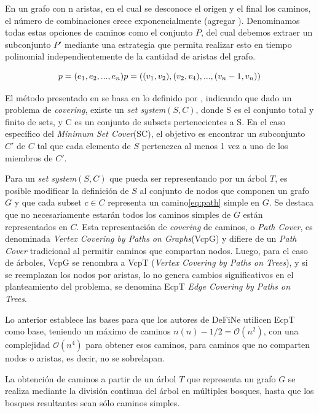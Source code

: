 En un grafo con n aristas, en el cual se desconoce el origen y el final los caminos, el n\'umero de combinaciones crece exponencialmente (agregar \cite{101 y 102 de define}). Denominamos todas estas opciones de caminos como el conjunto $P$, del cual debemos extraer un subconjunto $P'$ mediante una estrategia que permita realizar esto en tiempo polinomial independientemente de la cantidad de aristas del grafo.

\begin{equation}
p = (e_1, e_2,..., e_n)\\
p = ((v_1,v_2), (v_2,v_4),..., (v_n-1,v_n))
\label{eq:path}
\end{equation}

El m\'etodo presentado en \cite{breuer2015define} se basa en lo definido por \cite{lin2006vertex}, indicando que dado un problema de {\it covering}, existe un {\it set system}$(S,C)$, donde S es el conjunto total y finito de sets, y C es un conjunto de subsets pertenecientes a S. En el caso espec\'ifico del {\it Minimum Set Cover}(SC), el objetivo es encontrar un subconjunto $C'$ de $C$ tal que cada elemento de $S$ pertenezca al menos 1 vez a uno de los miembros de $C'$.

Para un {\it set system}$(S,C)$ que pueda ser representando por un \'arbol $T$, es posible modificar la definici\'on de $S$ al conjunto de nodos que componen un grafo $G$ y que cada subset $c \in C$ representa un camino\eqref{eq:path} simple en $G$. Se destaca que no necesariamente estar\'an todos los caminos simples de $G$ est\'an representados en $C$. Esta representaci\'on de {\it covering} de caminos, o {\it Path Cover}, es denominada {\it Vertex Covering by Paths on Graphs}(VcpG) y difiere de un {\it Path Cover} tradicional al permitir caminos que compartan nodos. Luego, para el caso de \'arboles, VcpG se renombra a VcpT ({\it Vertex Covering by Paths on Trees}), y si se reemplazan los nodos por aristas, lo no genera cambios significativos en el planteamiento del problema, se denomina EcpT {\it Edge Covering by Paths on Trees}. %


Lo anterior establece las bases para que los autores de DeFiNe\cite{breuer2015define} utilicen EcpT como base, teniendo un m\'aximo de caminos $n(n)-1/2 = \mathcal{O}(n^{2})$, con una complejidad $\mathcal{O}(n^{4})$ para obtener esos caminos, para caminos que no comparten nodos o aristas, es decir, no se sobrelapan.

La obtenci\'on de caminos a partir de un \'arbol $T$ que representa un grafo $G$ se realiza mediante la divisi\'on continua del \'arbol en m\'ultiples bosques, hasta que los bosques resultantes sean s\'olo caminos simples.

